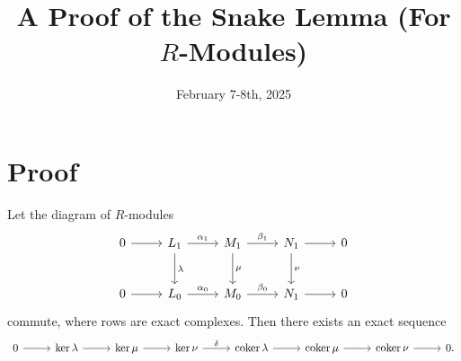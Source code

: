 \documentclass[11pt, letterpaper]{article}
\title{A Proof of the Snake Lemma (For $R$-Modules)}
\date{February 7-8th, 2025}
\DeclareMathOperator{\coker}{coker}
\begin{document}
\makereport
\section{Proof}
\begin{lemma}\label{snake}
	Let the diagram of $R$-modules
	\[\begin{tikzcd}[row sep = 2.5em, column sep = 2.5em]
		0\arrow[r]&L_1\arrow[r, "\alpha_1"]\arrow[d, "\lambda "]&M_1\arrow[r, "\beta _1"]\arrow[d, "\mu "]&N_1\arrow[r]\arrow[d, "\nu "]&0\\
		0\arrow[r]&L_0\arrow[r, "\alpha _0"]&M_0\arrow[r, "\beta _0"]&N_1\arrow[r]&0
	\end{tikzcd}\]
	commute, where rows are exact complexes. Then there exists an exact sequence
	\[\begin{tikzcd}[row sep = 2.5em, column sep = 2.5em]
		0\arrow[r]&\ker \lambda \arrow[r]&\ker \mu \arrow[r]&\ker \nu \arrow[r, "\delta "]&\coker \lambda \arrow[r]&\coker \mu \arrow[r]&\coker \nu \arrow[r]&0.
	\end{tikzcd}\]
\end{lemma}
\end{document}
